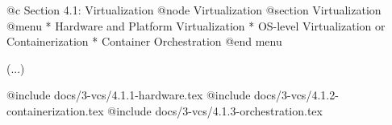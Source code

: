 @c Section 4.1: Virtualization
@node Virtualization
@section Virtualization
@menu
* Hardware and Platform Virtualization
* OS-level Virtualization or Containerization
* Container Orchestration
@end menu

(...)

@include docs/3-vcs/4.1.1-hardware.tex
@include docs/3-vcs/4.1.2-containerization.tex
@include docs/3-vcs/4.1.3-orchestration.tex
